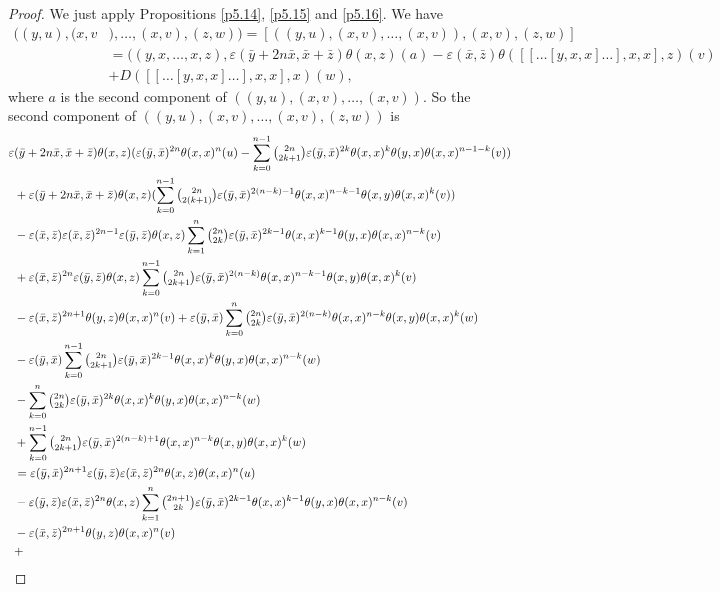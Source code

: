 \documentclass[11pt, twoside]{article}
\begin{document}
\begin{proof}
    We just apply Propositions \hyperref[p5.14]{\ref{p5.14}}, \ref{p5.15} and \ref{p5.16}. We have \begin{align*}
    ((y,u),(x,v&),\dots,(x,v),(z,w))= [((y,u),(x,v),\dots,(x,v)),(x,v),(z,w)] \\ & = ((y,x,\dots,x,z), \varepsilon(\bar{y}+2n\bar{x},\bar{x}+\bar{z})\theta(x,z)(a) - \varepsilon(\bar{x},\bar{z})\theta([[\dots[y,x,x]\dots],x,x],z)(v) \\ &+ D([[\dots[y,x,x]\dots],x,x],x)(w),  
    \end{align*} where $a$ is the second component of $((y,u),(x,v),\dots,(x,v)) $. So the second component of $ ((y,u),(x,v),\dots,(x,v),(z,w)) $ is \begin{align*}
         \varepsilon&(\bar{y}+2n\bar{x},\bar{x}+\bar{z})\theta(x,z)(\varepsilon(\bar{y},\bar{x})^{2n}\theta(x,x)^n(u)- \sum\limits_{k=0}^{n-1}\tbinom{2n}{2k+1}\varepsilon(\bar{y},\bar{x})^{2k}\theta(x,x)^k\theta(y,x)\theta(x,x)^{n-1-k}(v)) \\ & + \varepsilon(\bar{y}+2n\bar{x},\bar{x}+\bar{z})\theta(x,z)(\sum\limits_{k=0}^{n-1}\tbinom{2n}{2(k+1)}\varepsilon(\bar{y},\bar{x})^{2(n-k)-1}\theta(x,x)^{n-k-1}\theta(x,y)\theta(x,x)^k(v) ) \\ & - \varepsilon(\bar{x},\bar{z})\varepsilon(\bar{x},\bar{z})^{2n-1}\varepsilon(\bar{y},\bar{z})\theta(x,z)\sum\limits_{k=1}^n \tbinom{2n}{2k}\varepsilon(\bar{y},\bar{x})^{2k-1}\theta(x,x)^{k-1}\theta(y,x)\theta(x,x)^{n-k}(v) \\ & + \varepsilon(\bar{x},\bar{z})^{2n}\varepsilon(\bar{y},\bar{z})\theta(x,z)\sum\limits_{k=0}^{n-1}\tbinom{2n}{2k+1}\varepsilon(\bar{y},\bar{x})^{2(n-k)}\theta(x,x)^{n-k-1}\theta(x,y)\theta(x,x)^k(v) \\ & - \varepsilon(\bar{x},\bar{z})^{2n+1}\theta(y,z)\theta(x,x)^n(v) + \varepsilon(\bar{y},\bar{x})\sum\limits_{k=0}^n\tbinom{2n}{2k}\varepsilon(\bar{y},\bar{x})^{2(n-k)}\theta(x,x)^{n-k}\theta(x,y)\theta(x,x)^k(w) \\ & - \varepsilon(\bar{y},\bar{x})\sum\limits_{k=0}^{n-1}\tbinom{2n}{2k+1}\varepsilon(\bar{y},\bar{x})^{2k-1}\theta(x,x)^k\theta(y,x)\theta(x,x)^{n-k}(w) \\ & -\sum\limits_{k=0}^n\tbinom{2n}{2k}\varepsilon(\bar{y},\bar{x})^{2k}\theta(x,x)^k\theta(y,x)\theta(x,x)^{n-k}(w)\\ & + \sum\limits_{k=0}^{n-1}\tbinom{2n}{2k+1}\varepsilon(\bar{y},\bar{x})^{2(n-k)+1}\theta(x,x)^{n-k}\theta(x,y)\theta(x,x)^k(w) \\ & =\varepsilon(\bar{y},\bar{x})^{2n+1}\varepsilon(\bar{y},\bar{z})\varepsilon(\bar{x},\bar{z})^{2n}\theta(x,z)\theta(x,x)^n(u) \\ &  - \varepsilon(\bar{y},\bar{z})\varepsilon(\bar{x},\bar{z})^{2n}\theta(x,z)\sum\limits_{k=1}^n\tbinom{2n+1}{2k}\varepsilon(\bar{y},\bar{x})^{2k-1}\theta(x,x)^{k-1}\theta(y,x)\theta(x,x)^{n-k}(v) \\ &  - \varepsilon(\bar{x},\bar{z})^{2n+1}\theta(y,z)\theta(x,x)^n(v)\\ &  + 
\end{align*}
\end{proof}
\end{document}
